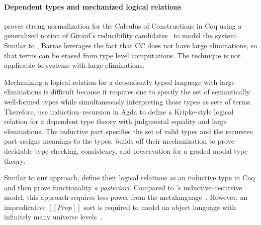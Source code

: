\documentclass[acmsmall]{acmart}
\makeatletter
\theoremstyle{linked}
\theoremstyle{deflinked}
\theoremstyle{acmdefinition}
\newcommand{\sw}[1]{}
\newcommand{\name}{\texorpdfstring{DCOI$^{\omega}$\@\xspace}{DCOI-omega}}
\newcommand{\aposteriori}{\textit{a posteriori}\@\xspace}
\makeatother
\begin{document}


\paragraph{Dependent types and mechanized logical relations}
\citet{barras:coq-coq} proves strong normalization for the Calculus of
Constructions in Coq using  a generalized
notion of Girard's reducibility candidates~\citep{girard:proofs}
to model the system. Similar to \citet{geuvers:cc-sn}, Barras
leverages the fact that CC does not have large eliminations, so
that terms can be erased from type level computations.
The technique is not applicable to systems with large eliminations. %

Mechanizing a logical relation for a dependently typed language with large
eliminations is difficult because it requires one to specify the set of
semantically well-formed types while simultaneously interpreting those
types as sets of terms.
Therefore, \citet{abel:dectt} use induction--recursion in Agda to define a Kripke-style
logical relation for a dependent type theory with judgmental equality and
large eliminations. The inductive part specifies the set of valid types and
the recursive part assigns meanings to the types. \citet{abel:grade} builds
off their mechanization to prove decidable type checking, consistency, and
preservation for a graded modal type theory.

Similar to our approach, \citet{anand:corenuprl,
wieczorek:coqnbe, adjedj:mltt-coq} define their logical relations
as an inductive type in Coq and then prove functionality \aposteriori.
Compared to \citet{abel:dectt}'s
inductive--recursive model, this approach requires less power from the
metalanguage~\citep{adjedj:mltt-coq}. However, an impredicative
$[[Prop]]$ sort is required to model an object language with infinitely
many universe levels~\citep{anand:corenuprl}.
\end{document}
